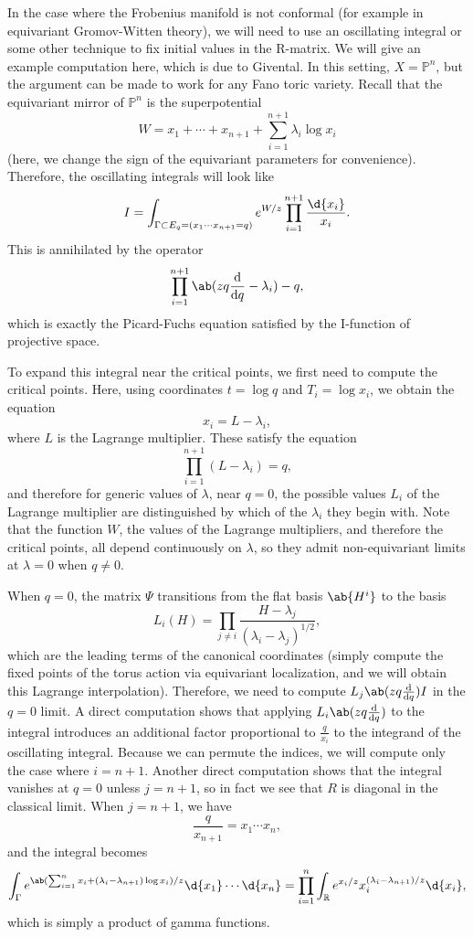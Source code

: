 \documentclass{amsart}
\theoremstyle{definition}
\theoremstyle{remark}
\theoremstyle{plain}
\theoremstyle{definition}
\theoremstyle{remark}
\newcommand{\R}{\mathbb{R}}
\renewcommand{\P}{\mathbb{P}}
\newcommand{\1}{\mathbf{1}}
\newcommand{\2}{\mathbf{2}}
\newcommand{\3}{\mathbf{3}}
\begin{document}
In the case where the Frobenius manifold is not conformal (for example in equivariant Gromov-Witten theory), we will need to use an oscillating integral or some other technique to fix initial values in the R-matrix. We will give an example computation here, which is due to Givental. In this setting, \(X = \P^n\), but the argument can be made to work for any Fano toric variety. Recall that the equivariant mirror of \(\P^n\) is the superpotential
\[ W = x_1 + \cdots + x_{n+1} + \sum_{i=1}^{n+1} \lambda_i \log x_i \]
(here, we change the sign of the equivariant parameters for convenience). Therefore, the oscillating integrals will look like
\[ I = \int_{\Gamma \subset E_q = (x_1 \cdots x_{n+1}=q)} e^{W/z} \prod_{i=1}^{n+1} \frac{\d{x_i}}{x_i}. \]
This is annihilated by the operator 
\[ \prod_{i=1}^{n+1}\ab(zq \odv{}{q} -\lambda_i) - q, \]
which is exactly the Picard-Fuchs equation satisfied by the I-function of projective space.

To expand this integral near the critical points, we first need to compute the critical points. Here, using coordinates \(t = \log q\) and \(T_i = \log x_i\), we obtain the equation
\[ x_i = L - \lambda_i, \]
where \(L\) is the Lagrange multiplier. These satisfy the equation
\[ \prod_{i=1}^{n+1} (L - \lambda_i) = q, \]
and therefore for generic values of \(\lambda\), near \(q = 0\), the possible values \(L_i\) of the Lagrange multiplier are distinguished by which of the \(\lambda_i\) they begin with. Note that the function \(W\), the values of the Lagrange multipliers, and therefore the critical points, all depend continuously on \(\lambda\), so they admit non-equivariant limits at \(\lambda = 0\) when \(q \neq 0\).

When \(q = 0\), the matrix \(\Psi\) transitions from the flat basis \(\ab{H^i}\) to the basis
\[ L_i(H) = \prod_{j \neq i} \frac{H - \lambda_j}{(\lambda_i - \lambda_j)^{1/2}}, \]
which are the leading terms of the canonical coordinates (simply compute the fixed points of the torus action via equivariant localization, and we will obtain this Lagrange interpolation). Therefore, we need to compute \(L_j \ab(z q \odv{}{q}) I\) in the \(q = 0\) limit. A direct computation shows that applying \(L_i \ab(z q \odv{}{q})\) to the integral introduces an additional factor proportional to \(\frac{q}{x_i}\) to the integrand of the oscillating integral. Because we can permute the indices, we will compute only the case where \(i = n+1\). Another direct computation shows that the integral vanishes at \(q = 0\) unless \( j = n+1\), so in fact we see that \(R\) is diagonal in the classical limit. When \(j = n+1\), we have
\[ \frac{q}{x_{n+1}} = x_1 \cdots x_n, \]
and the integral becomes
\[ \int_{\Gamma} e^{\ab( \sum_{i=1}^n x_i + (\lambda_i - \lambda_{n+1})\log x_i ) / z} \d{x_1} \cdots \d{x_n} = \prod_{i=1}^n \int_{\R} e^{x_i/z} x_i^{(\lambda_i - \lambda_{n+1})/z} \d{x_i}, \]
which is simply a product of gamma functions.
\end{document}
